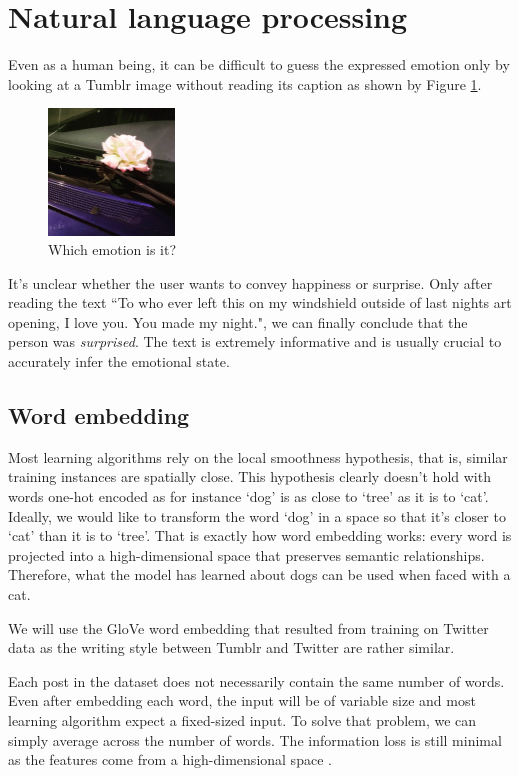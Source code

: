 \documentclass{article} %
\begin{document}
\section{Natural language processing}
Even as a human being, it can be difficult to guess the expressed emotion only by looking at a Tumblr image without reading its caption as shown by Figure \ref{surprised-unclear}.

\begin{figure}[H]
    \centering
    \includegraphics[width=0.3\textwidth]{Images/flower.jpg}
    \caption{Which emotion is it?}
    \label{surprised-unclear}
\end{figure}

It's unclear whether the user wants to convey happiness or surprise. Only after reading the text ``To who ever left this on my windshield outside of last nights art opening, I love you. You made my night.", we can finally conclude that the person was {\em surprised}. The text is extremely informative and is usually crucial to accurately infer the emotional state.

\subsection{Word embedding}
Most learning algorithms rely on the local smoothness hypothesis, that is, similar training instances are spatially close. This hypothesis clearly doesn't hold with words one-hot encoded as for instance `dog' is as close to `tree' as it is to `cat'. Ideally, we would like to transform the word `dog' in a space so that it's closer to `cat' than it is to `tree'. That is exactly how word embedding works: every word is projected into a high-dimensional space that preserves semantic relationships. Therefore, what the model has learned about dogs can be used when faced with a cat.

We will use the GloVe word embedding that resulted from training on Twitter data as the writing style between Tumblr and Twitter are rather similar.

Each post in the dataset does not necessarily contain the same number of words. Even after embedding each word, the input will be of variable size and most learning algorithm expect a fixed-sized input. To solve that problem, we can simply average across the number of words. The information loss is still minimal as the features come from a high-dimensional space \citep{Flaxman-15}.
\end{document}
